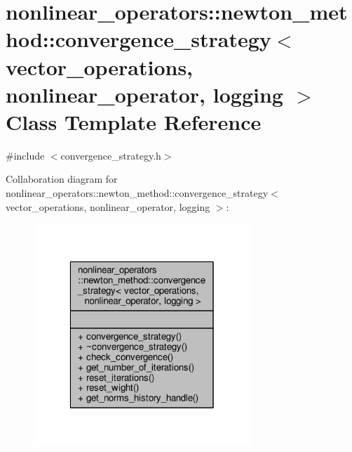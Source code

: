\hypertarget{classnonlinear__operators_1_1newton__method_1_1convergence__strategy}{\section{nonlinear\-\_\-operators\-:\-:newton\-\_\-method\-:\-:convergence\-\_\-strategy$<$ vector\-\_\-operations, nonlinear\-\_\-operator, logging $>$ Class Template Reference}
\label{classnonlinear__operators_1_1newton__method_1_1convergence__strategy}
}


{\ttfamily \#include $<$convergence\-\_\-strategy.\-h$>$}



Collaboration diagram for nonlinear\-\_\-operators\-:\-:newton\-\_\-method\-:\-:convergence\-\_\-strategy$<$ vector\-\_\-operations, nonlinear\-\_\-operator, logging $>$\-:
\nopagebreak
\begin{figure}[H]
\begin{center}
\leavevmode
\includegraphics[width=232pt]{classnonlinear__operators_1_1newton__method_1_1convergence__strategy__coll__graph}
\end{center}
\end{figure}
